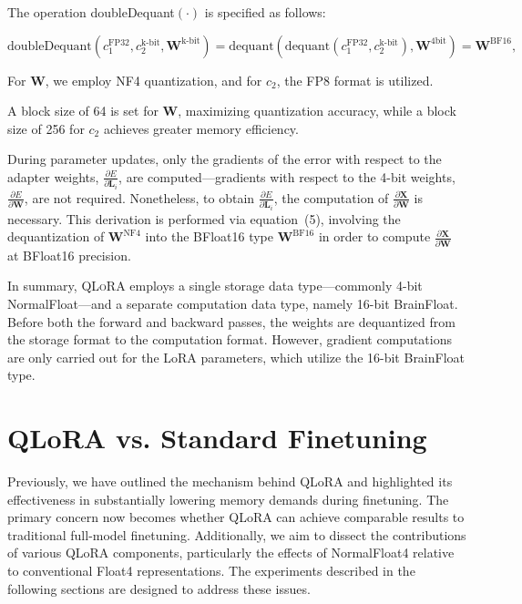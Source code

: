The operation doubleDequant$(\cdot)$ is specified as follows:

\begin{equation}
    \text{doubleDequant}(c_1^{\text{FP32}}, c_2^{\text{k-bit}}, \mathbf{W}^{\text{k-bit}}) = \text{dequant}(\text{dequant}(c_1^{\text{FP32}}, c_2^{\text{k-bit}}), \mathbf{W}^{\text{4bit}}) = \mathbf{W}^{\text{BF16}},
\end{equation}

For $\mathbf{W}$, we employ NF4 quantization, and for $c_2$, the FP8 format is utilized.

A block size of 64 is set for $\mathbf{W}$, maximizing quantization accuracy, while a block size of 256 for $c_2$ achieves greater memory efficiency.

During parameter updates, only the gradients of the error with respect to the adapter weights, $\frac{\partial E}{\partial \mathbf{L}_i}$, are computed—gradients with respect to the 4-bit weights, $\frac{\partial E}{\partial \mathbf{W}}$, are not required. Nonetheless, to obtain $\frac{\partial E}{\partial \mathbf{L}_i}$, the computation of $\frac{\partial \mathbf{X}}{\partial \mathbf{W}}$ is necessary. This derivation is performed via equation~(5), involving the dequantization of $\mathbf{W}^{\text{NF4}}$ into the BFloat16 type $\mathbf{W}^{\text{BF16}}$ in order to compute $\frac{\partial \mathbf{X}}{\partial \mathbf{W}}$ at BFloat16 precision.

In summary, \textsc{QLoRA} employs a single storage data type—commonly 4-bit NormalFloat—and a separate computation data type, namely 16-bit BrainFloat. Before both the forward and backward passes, the weights are dequantized from the storage format to the computation format. However, gradient computations are only carried out for the LoRA parameters, which utilize the 16-bit BrainFloat type.

\section{QLoRA vs. Standard Finetuning}
\label{sec:comp_to_std}

Previously, we have outlined the mechanism behind QLoRA and highlighted its effectiveness in substantially lowering memory demands during finetuning. The primary concern now becomes whether QLoRA can achieve comparable results to traditional full-model finetuning. Additionally, we aim to dissect the contributions of various QLoRA components, particularly the effects of NormalFloat4 relative to conventional Float4 representations. The experiments described in the following sections are designed to address these issues.

